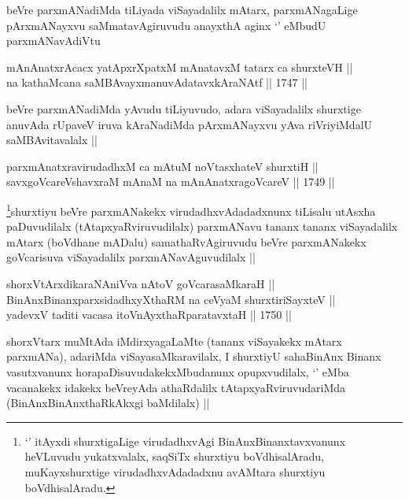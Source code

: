 \begin{artha}
beVre parxmANadiMda tiLiyada viSayadalilx mAtarx, parxmANagaLige
pArxmANayxvu saMmatavAgiruvudu anayxthA aginx `\stext' eMbudU
parxmANavAdiVtu  
\end{artha}

\begin{shl}
mAnAnatxrAcacx yatApxrXpatxM mAnatavxM tatarx ca shurxteVH || \\
na kathaMcana saMBAvayxmanuvAdatavxkAraNAtf ||  1747 ||  
\end{shl}

\begin{artha}
beVre parxmANadiMda yAvudu tiLiyuvudo, adara viSayadalilx shurxtige
anuvAda rUpaveV iruva kAraNadiMda pArxmANayxvu yAva riVriyiMdalU
saMBAvitavalalx ||
\end{artha}


\begin{shl}
parxmAnatxravirudadhxM ca mAtuM noVtasxhateV shurxtiH || \\
savxgoVcareVshavxraM mAnaM na mAnAnatxragoVcareV ||  1749 ||  
\end{shl}

\begin{artha}
\footnote[1]{`\stext' itAyxdi shurxtigaLige virudadhxvAgi
  BinAnxBinanxtavxvanunx heVLuvudu yukatxvalalx, saqSiTx shurxtiyu
  boVdhisalAradu, muKayxshurxtige virudadhxvAdadadxnu avAMtara
  shurxtiyu boVdhisalAradu.}shurxtiyu beVre parxmANakekx virudadhxvAdadadxnunx
tiLisalu utAsxha paDuvudilalx (tAtapxyaRviruvudilalx) parxmANavu
tananx tananx viSayadalilx mAtarx (boVdhane mADalu) samathaRvAgiruvudu
beVre parxmANakekx goVcarisuva viSayadalilx parxmANavAguvudilalx ||
\end{artha}


\begin{shl}
shorxVtArxdikaraNAniVva nAtoV goVcarasaMkaraH || \\
BinAnxBinanxparxsidadhxyXthaRM na ceVyaM shurxtiriSayxteV || \\
yadevxV taditi vacasa itoV\s nAyxthaRparatavxtaH ||  1750 || 
\end{shl}

\begin{artha}
shorxVtarx muMtAda iMdirxyagaLaMte (tananx viSayakekx mAtarx
parxmANa), adariMda viSayasaMkaravilalx, I shurxtiyU sahaBinAnx Binanx
vasutxvanunx horapaDisuvudakekxMbudanunx opupxvudilalx, `\stext' eMba
vacanakekx idakekx beVreyAda athaRdalilx tAtapxyaRviruvudariMda
(BinAnxBinAnxthaRkAkxgi baMdilalx) ||
\end{artha}

